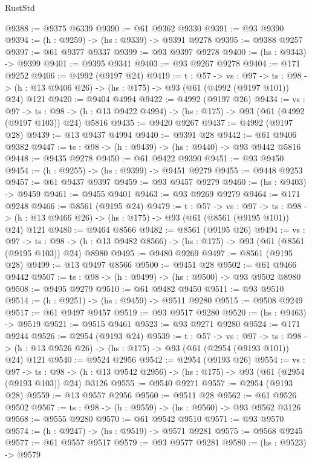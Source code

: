 \begin{lexlean}{RustStd}
\begin{coremodule}
@9388 := @9375 @6339
@9390 := @61 @9362 @9330
@9391 := @93 @9390
@9394 := (h : @9259) -> (hs : @9339) -> @9391 @9278
@9395 := @9388 @9257
@9397 := @61 @9377 @9337
@9399 := @93 @9397 @9278
@9400 := (hs : @9343) -> @9399
@9401 := @9395 @9341
@9403 := @93 @9267 @9278
@9404 := @171 @9252
@9406 := @4992 (@9197 @24)
@9419 := {t : @57} ->
  {vs : @97} ->
  {ts : @98} -> (h : @13 @9406 @26) -> (hs : @175) -> @93 (@61 (@4992 (@9197 @101)) @24) @121
@9420 := @9404 @4994
@9422 := @4992 (@9197 @26)
@9434 := {vs : @97} ->
  {ts : @98} -> (h : @13 @9422 @4994) -> (hs : @175) -> @93 (@61 (@4992 (@9197 @103)) @24) @5816
@9435 := @9420 @9267
@9437 := @4992 (@9197 @28)
@9439 := @13 @9437 @4994
@9440 := @9391 @28
@9442 := @61 @9406 @9382
@9447 := {ts : @98} -> (h : @9439) -> (hs : @9440) -> @93 @9442 @5816
@9448 := @9435 @9278
@9450 := @61 @9422 @9390
@9451 := @93 @9450
@9454 := (h : @9255) -> (hs : @9399) -> @9451 @9279
@9455 := @9448 @9253
@9457 := @61 @9437 @9397
@9459 := @93 @9457 @9279
@9460 := (hs : @9403) -> @9459
@9461 := @9455 @9401
@9463 := @93 @9269 @9279
@9464 := @171 @9248
@9466 := @8561 (@9195 @24)
@9479 := {t : @57} ->
  {vs : @97} ->
  {ts : @98} -> (h : @13 @9466 @26) -> (hs : @175) -> @93 (@61 (@8561 (@9195 @101)) @24) @121
@9480 := @9464 @8566
@9482 := @8561 (@9195 @26)
@9494 := {vs : @97} ->
  {ts : @98} -> (h : @13 @9482 @8566) -> (hs : @175) -> @93 (@61 (@8561 (@9195 @103)) @24) @8980
@9495 := @9480 @9269
@9497 := @8561 (@9195 @28)
@9499 := @13 @9497 @8566
@9500 := @9451 @28
@9502 := @61 @9466 @9442
@9507 := {ts : @98} -> (h : @9499) -> (hs : @9500) -> @93 @9502 @8980
@9508 := @9495 @9279
@9510 := @61 @9482 @9450
@9511 := @93 @9510
@9514 := (h : @9251) -> (hs : @9459) -> @9511 @9280
@9515 := @9508 @9249
@9517 := @61 @9497 @9457
@9519 := @93 @9517 @9280
@9520 := (hs : @9463) -> @9519
@9521 := @9515 @9461
@9523 := @93 @9271 @9280
@9524 := @171 @9244
@9526 := @2954 (@9193 @24)
@9539 := {t : @57} ->
  {vs : @97} ->
  {ts : @98} -> (h : @13 @9526 @26) -> (hs : @175) -> @93 (@61 (@2954 (@9193 @101)) @24) @121
@9540 := @9524 @2956
@9542 := @2954 (@9193 @26)
@9554 := {vs : @97} ->
  {ts : @98} -> (h : @13 @9542 @2956) -> (hs : @175) -> @93 (@61 (@2954 (@9193 @103)) @24) @3126
@9555 := @9540 @9271
@9557 := @2954 (@9193 @28)
@9559 := @13 @9557 @2956
@9560 := @9511 @28
@9562 := @61 @9526 @9502
@9567 := {ts : @98} -> (h : @9559) -> (hs : @9560) -> @93 @9562 @3126
@9568 := @9555 @9280
@9570 := @61 @9542 @9510
@9571 := @93 @9570
@9574 := (h : @9247) -> (hs : @9519) -> @9571 @9281
@9575 := @9568 @9245
@9577 := @61 @9557 @9517
@9579 := @93 @9577 @9281
@9580 := (hs : @9523) -> @9579

\end{coremodule}
\end{lexlean}
